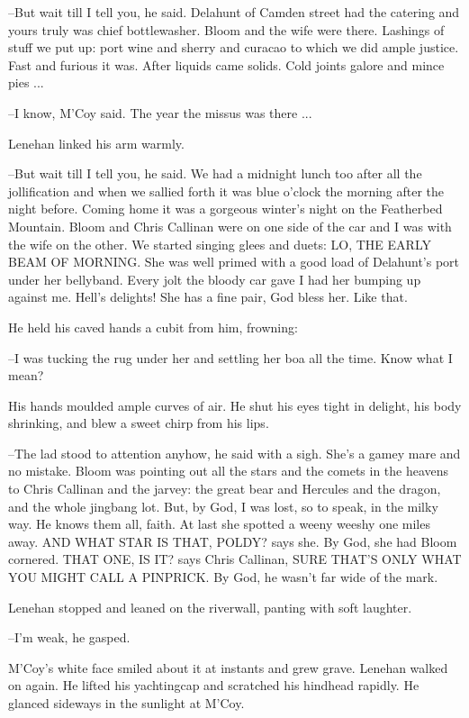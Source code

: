 --But wait till I tell you, he said. Delahunt of Camden street had the
catering and yours truly was chief bottlewasher. Bloom and the wife were
there. Lashings of stuff we put up: port wine and sherry and curacao to
which we did ample justice. Fast and furious it was. After liquids came
solids. Cold joints galore and mince pies ...

--I know, M'Coy said.
The year the missus was there ...

Lenehan linked his arm warmly.

--But wait till I tell you, he said. We had a midnight lunch too after all
the jollification and when we sallied forth it was blue o'clock the
morning after the night before. Coming home it was a gorgeous winter's
night on the Featherbed Mountain. Bloom and Chris Callinan were on one
side of the car and I was with the wife on the other. We started singing
glees and duets: LO, THE EARLY BEAM OF MORNING. She was well primed with a
good load of Delahunt's port under her bellyband. Every jolt the bloody
car gave I had her bumping up against me. Hell's delights! She has a fine
pair, God bless her.
Like that.


He held his caved hands a cubit from him, frowning:

--I was tucking the rug under her and settling her boa all the time. Know
what I mean?

His hands moulded ample curves of air. He shut his eyes tight in
delight, his body shrinking, and blew a sweet chirp from his lips.

--The lad stood to attention anyhow, he said with a sigh. She's a gamey
mare and no mistake. Bloom was pointing out all the stars and the comets
in the heavens to Chris Callinan and the jarvey: the great bear and
Hercules and the dragon, and the whole jingbang lot. But, by God, I was
lost, so to speak, in the milky way.
He knows them all, faith. At last she
spotted a weeny weeshy one miles away. AND WHAT STAR IS THAT, POLDY? says
she. By God, she had Bloom cornered. THAT ONE, IS IT? says Chris Callinan,
SURE THAT'S ONLY WHAT YOU MIGHT CALL A PINPRICK. By God, he wasn't far
wide of the mark.

Lenehan stopped and leaned on the riverwall, panting with soft
laughter.

--I'm weak, he gasped.

M'Coy's white face smiled about it at instants and grew grave.
Lenehan walked on again. He lifted his yachtingcap and scratched his
hindhead rapidly.
He glanced sideways in the sunlight at M'Coy.

